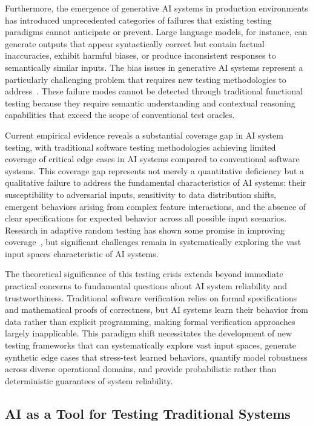 \documentclass[manuscript,screen,review]{acmart}
\begin{document}
Furthermore, the emergence of generative AI systems in production environments has introduced unprecedented categories of failures that existing testing paradigms cannot anticipate or prevent. Large language models, for instance, can generate outputs that appear syntactically correct but contain factual inaccuracies, exhibit harmful biases, or produce inconsistent responses to semantically similar inputs. The bias issues in generative AI systems represent a particularly challenging problem that requires new testing methodologies to address~\cite{Zhou2024}. These failure modes cannot be detected through traditional functional testing because they require semantic understanding and contextual reasoning capabilities that exceed the scope of conventional test oracles.

Current empirical evidence reveals a substantial coverage gap in AI system testing, with traditional software testing methodologies achieving limited coverage of critical edge cases in AI systems compared to conventional software systems. This coverage gap represents not merely a quantitative deficiency but a qualitative failure to address the fundamental characteristics of AI systems: their susceptibility to adversarial inputs, sensitivity to data distribution shifts, emergent behaviors arising from complex feature interactions, and the absence of clear specifications for expected behavior across all possible input scenarios. Research in adaptive random testing has shown some promise in improving coverage~\cite{Chen2004}, but significant challenges remain in systematically exploring the vast input spaces characteristic of AI systems.

The theoretical significance of this testing crisis extends beyond immediate practical concerns to fundamental questions about AI system reliability and trustworthiness. Traditional software verification relies on formal specifications and mathematical proofs of correctness, but AI systems learn their behavior from data rather than explicit programming, making formal verification approaches largely inapplicable. This paradigm shift necessitates the development of new testing frameworks that can systematically explore vast input spaces, generate synthetic edge cases that stress-test learned behaviors, quantify model robustness across diverse operational domains, and provide probabilistic rather than deterministic guarantees of system reliability.

\subsection{AI as a Tool for Testing Traditional Systems}
\end{document}
